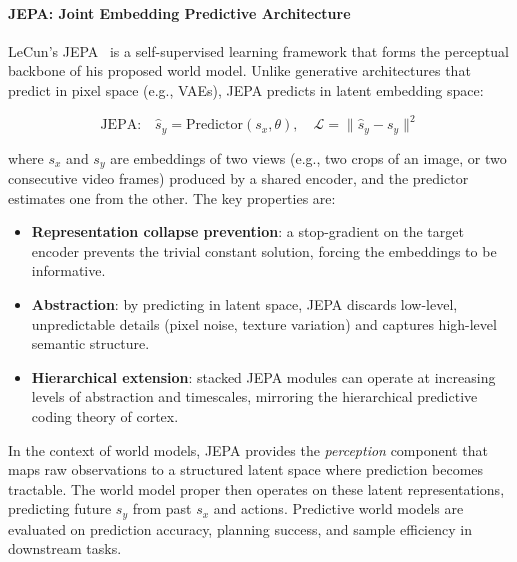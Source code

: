 \documentclass{tufte-handout}
\begin{document}
\paragraph{JEPA: Joint Embedding Predictive Architecture}
LeCun's JEPA~\nocite{lecun2022} is a
self-supervised learning framework that forms the perceptual backbone of his proposed world
model. Unlike generative architectures that predict in pixel space (e.g., VAEs), JEPA predicts
in latent embedding space:

\begin{equation}
    \text{JEPA:} \quad \hat{s}_y = \text{Predictor}(s_x, \theta), \quad \mathcal{L} = \|\hat{s}_y - s_y\|^2
    \label{eq:jepa}
\end{equation}


where $s_x$ and $s_y$ are embeddings of two views (e.g., two crops of an image, or two
consecutive video frames) produced by a shared encoder, and the predictor estimates one from the
other. The key properties are:

\begin{itemize}
    \item \textbf{Representation collapse prevention}: a stop-gradient on the target encoder
          prevents the trivial constant solution, forcing the embeddings to be informative.
    \item \textbf{Abstraction}: by predicting in latent space, JEPA discards low-level,
          unpredictable details (pixel noise, texture variation) and captures high-level
          semantic structure.
    \item \textbf{Hierarchical extension}: stacked JEPA modules can operate at increasing
          levels of abstraction and timescales, mirroring the hierarchical predictive coding
          theory of cortex.
\end{itemize}

In the context of world models, JEPA provides the \textit{perception} component that maps raw
observations to a structured latent space where prediction becomes tractable. The world model
proper then operates on these latent representations, predicting future $s_y$ from past $s_x$
and actions.
Predictive world models are evaluated on prediction accuracy, planning success, and sample
efficiency in downstream tasks.
\end{document}
